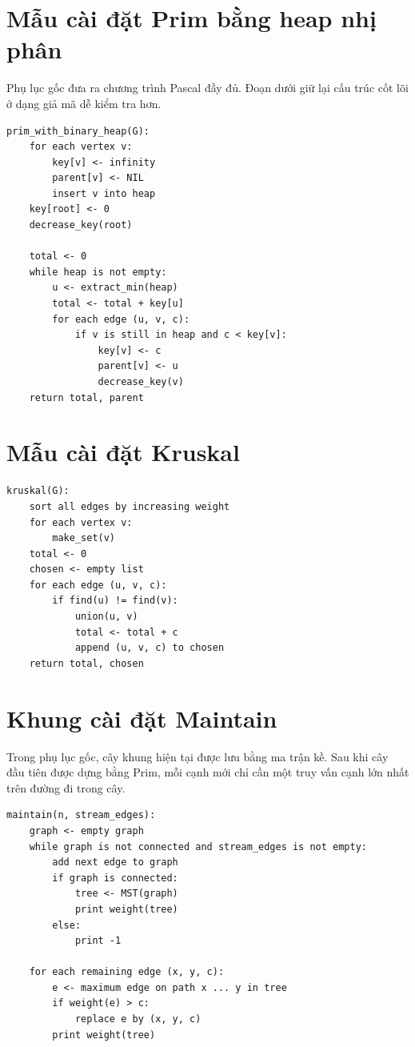 \documentclass[11pt]{article}
\begin{document}
\appendix

\section{Mẫu cài đặt Prim bằng heap nhị phân}

Phụ lục gốc đưa ra chương trình Pascal đầy đủ. Đoạn dưới giữ lại cấu trúc cốt
lõi ở dạng giả mã dễ kiểm tra hơn.

\begin{verbatim}
prim_with_binary_heap(G):
    for each vertex v:
        key[v] <- infinity
        parent[v] <- NIL
        insert v into heap
    key[root] <- 0
    decrease_key(root)

    total <- 0
    while heap is not empty:
        u <- extract_min(heap)
        total <- total + key[u]
        for each edge (u, v, c):
            if v is still in heap and c < key[v]:
                key[v] <- c
                parent[v] <- u
                decrease_key(v)
    return total, parent
\end{verbatim}

\section{Mẫu cài đặt Kruskal}

\begin{verbatim}
kruskal(G):
    sort all edges by increasing weight
    for each vertex v:
        make_set(v)
    total <- 0
    chosen <- empty list
    for each edge (u, v, c):
        if find(u) != find(v):
            union(u, v)
            total <- total + c
            append (u, v, c) to chosen
    return total, chosen
\end{verbatim}

\section{Khung cài đặt Maintain}

Trong phụ lục gốc, cây khung hiện tại được lưu bằng ma trận kề. Sau khi cây
đầu tiên được dựng bằng Prim, mỗi cạnh mới chỉ cần một truy vấn cạnh lớn nhất
trên đường đi trong cây.

\begin{verbatim}
maintain(n, stream_edges):
    graph <- empty graph
    while graph is not connected and stream_edges is not empty:
        add next edge to graph
        if graph is connected:
            tree <- MST(graph)
            print weight(tree)
        else:
            print -1

    for each remaining edge (x, y, c):
        e <- maximum edge on path x ... y in tree
        if weight(e) > c:
            replace e by (x, y, c)
        print weight(tree)
\end{verbatim}
\end{document}
